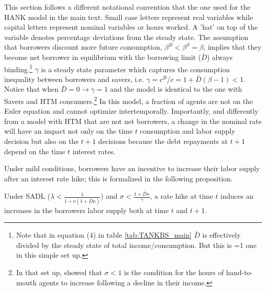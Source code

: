 \documentclass[a4paper,12pt]{article}%
\begin{document}
This section follows a different notational convention that the one used for the HANK model in the main text. Small case letters represent real variables while capital letters represent nominal variables or hours worked. A 'hat' on top of the variable denotes percentage deviations from the steady state. 
The assumption that borrowers discount more future consumption, $\beta^B<\beta^S=\beta$, implies that they become net borrower in equilibrium with the borrowing limit ($\bar{D}$) always binding.\footnote{Note that in equation (4) in table \ref{tab:TANKBS_main} $\bar{D}$ is effectively divided by the steady state of total income/consumption. But this is =1 one in this simple set up. }  $\gamma$ is a steady state parameter which captures the consumption inequality between borrowers and savers, i.e. $\gamma=c^B/c=1+\bar{D}(\beta-1)<1$. Notice that when $\bar{D}=0 \rightarrow \gamma=1$ and the model is identical to the one with Savers and HTM consumers.\footnote{In that set up, \cite{Bilbiie:2008} showed that $\sigma<1$ is the condition for the hours of hand-to-mouth agents to increase following a decline in their income.} In this model,  a fraction of agents are not on the Euler equation and cannot optimize intertemporally. Importantly, and differently from a model with HTM that are not net borrowers, a change in the nominal rate will have an impact not only on the time $t$ consumption and labor supply decision but also on the $t+1$ decisions because the debt repayments at $t+1$ depend on the time $t$ interest rates. 

Under mild conditions, borrowers have an incentive to increase their labor supply after an interest rate hike; this is formalized in the following proposition.
\begin{proposition}\label{T:propBS}
Under SADL ($\lambda<\frac{1}{1+\nu(1+\bar{D}\kappa)}$) and $\sigma<\frac{1+\bar{D}\kappa}{\gamma}$, a rate hike at time $t$ induces an increases in the borrowers labor supply both at time $t$ and $t+1$.
\end{proposition}
\end{document}
